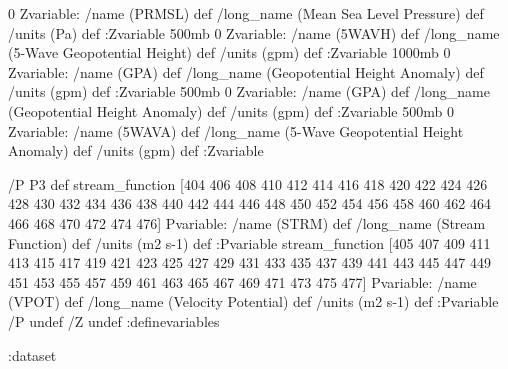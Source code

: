 \begin{ingrid}

0 Zvariable: /name (PRMSL) def /long_name (Mean Sea Level Pressure) def /units (Pa) def :Zvariable
500mb 0 Zvariable: /name (5WAVH) def /long_name (5-Wave Geopotential Height) def /units (gpm) def :Zvariable
1000mb 0 Zvariable: /name (GPA) def /long_name (Geopotential Height Anomaly) def /units (gpm) def :Zvariable
500mb 0 Zvariable: /name (GPA) def /long_name (Geopotential Height Anomaly) def /units (gpm) def :Zvariable
500mb 0 Zvariable: /name (5WAVA) def /long_name (5-Wave Geopotential Height Anomaly) def /units (gpm) def :Zvariable

\end{ingrid}
\begin{ingrid}

/P P3 def
stream_function [404 406 408 410 412 414 416 418 420 422 424 426 428 430 432 434 436 438 440 442 444 446 448 450 452 454 456 458 460 462 464 466 468 470 472 474 476] Pvariable: /name (STRM) def /long_name (Stream Function) def /units (m2 s-1) def :Pvariable
stream_function [405 407 409 411 413 415 417 419 421 423 425 427 429 431 433 435 437 439 441 443 445 447 449 451 453 455 457 459 461 463 465 467 469 471 473 475 477] Pvariable: /name (VPOT) def /long_name (Velocity Potential) def /units (m2 s-1) def :Pvariable
/P undef
/Z undef
:definevariables

:dataset
\end{ingrid}
